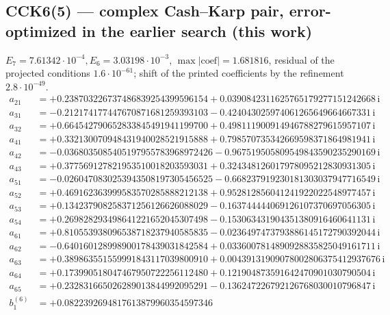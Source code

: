 \subsection*{CCK6(5) --- complex Cash--Karp pair, error-optimized in the earlier search (this work)}
$E_{7}=7.61342\cdot10^{-4}, E_{6}=3.03198\cdot10^{-3}$, $\max|\text{coef}|=1.681816$, residual of the projected conditions $1.6\cdot10^{-61}$; shift of the printed coefficients by the refinement $2.8\cdot10^{-49}$. 
{\small
\begin{align*}
a_{21} &= +0.238703226737486839254399596154 + 0.0390842311625765179277151242668\,\mathrm{i}\\
a_{31} &= -0.212174177447670871681259393103 - 0.424043025974061265649664667331\,\mathrm{i}\\
a_{32} &= +0.664542790652833845491941199700 + 0.498111900914946788279615957107\,\mathrm{i}\\
a_{41} &= +0.332130070948431940028521915888 + 0.798570735342669598371864981941\,\mathrm{i}\\
a_{42} &= -0.0368035085405197955783968972426 - 0.967519505809549843590235290169\,\mathrm{i}\\
a_{43} &= +0.377569127821953510018203593031 + 0.324348126017978095212830931305\,\mathrm{i}\\
a_{51} &= -0.0260470830253943508197305456525 - 0.668237919230181303037947716549\,\mathrm{i}\\
a_{52} &= +0.469162363999583570285888212138 + 0.952812856041241922022548977457\,\mathrm{i}\\
a_{53} &= +0.134237908258371256126626088029 - 0.163744444069126107370697056305\,\mathrm{i}\\
a_{54} &= +0.269828293498641221652045307498 - 0.153063431904351380916460641131\,\mathrm{i}\\
a_{61} &= +0.810553938096538718237940585835 - 0.0236497473793886145172790392044\,\mathrm{i}\\
a_{62} &= -0.640160128998900178439031842584 + 0.0336007814890928835825049161711\,\mathrm{i}\\
a_{63} &= +0.389863551559991843117039800910 + 0.00439131909078002806375412937676\,\mathrm{i}\\
a_{64} &= +0.173990518047467950722256112480 + 0.121904873591642470901030790504\,\mathrm{i}\\
a_{65} &= +0.232831665026289013844992095291 - 0.136247226792126768030010796847\,\mathrm{i}\\[1mm]
b^{(6)}_{1} &= +0.0822392694817613879960354597346\\

\end{align*}}
